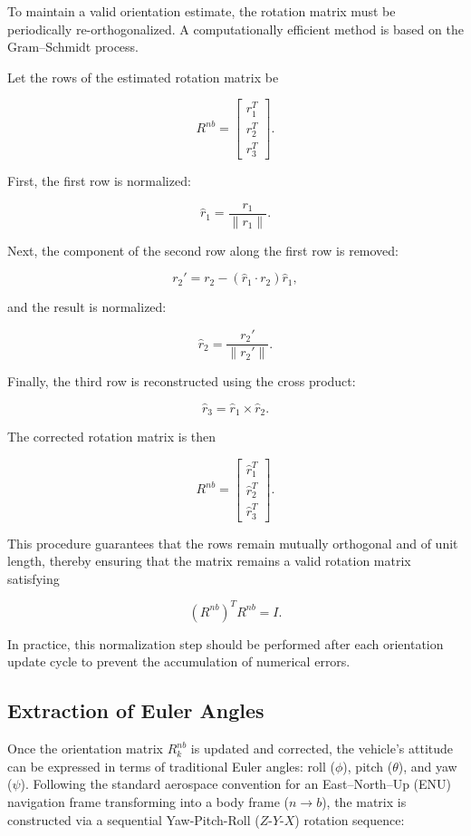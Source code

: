 \documentclass{article}
\begin{document}
\vspace{1em}
\noindent To maintain a valid orientation estimate, the rotation matrix must be periodically re-orthogonalized. A computationally efficient method is based on the Gram--Schmidt process.

\vspace{1em}
\noindent Let the rows of the estimated rotation matrix be

\[
R^{nb} =
\begin{bmatrix}
	r_1^T \\
	r_2^T \\
	r_3^T
\end{bmatrix}.
\]

First, the first row is normalized:

\[
\hat r_1 = \frac{r_1}{\|r_1\|}.
\]

Next, the component of the second row along the first row is removed:

\[
r_2' = r_2 - (\hat r_1 \cdot r_2)\hat r_1,
\]

and the result is normalized:

\[
\hat r_2 = \frac{r_2'}{\|r_2'\|}.
\]

Finally, the third row is reconstructed using the cross product:

\[
\hat r_3 = \hat r_1 \times \hat r_2.
\]

The corrected rotation matrix is then

\[
R^{nb} =
\begin{bmatrix}
	\hat r_1^T \\
	\hat r_2^T \\
	\hat r_3^T
\end{bmatrix}.
\]

\vspace{1em}
\noindent This procedure guarantees that the rows remain mutually orthogonal and of unit length, thereby ensuring that the matrix remains a valid rotation matrix satisfying

\[
(R^{nb})^T R^{nb} = I.
\]

\vspace{1em}
\noindent In practice, this normalization step should be performed after each orientation update cycle to prevent the accumulation of numerical errors.

\subsection{Extraction of Euler Angles}

Once the orientation matrix $R_{k}^{nb}$ is updated and corrected, the vehicle's attitude can be expressed in terms of traditional Euler angles: roll ($\phi$), pitch ($\theta$), and yaw ($\psi$). Following the standard aerospace convention for an East--North--Up (ENU) navigation frame transforming into a body frame ($n \rightarrow b$), the matrix is constructed via a sequential Yaw-Pitch-Roll ($Z$-$Y$-$X$) rotation sequence:
\end{document}
